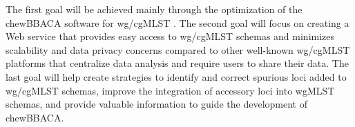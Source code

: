 The first goal will be achieved mainly through the optimization of the chewBBACA software for \ac{wg/cgMLST} \cite{silva_chewbbaca_2018}. The second goal will focus on creating a Web service that provides easy access to \ac{wg/cgMLST} schemas and minimizes scalability and data privacy concerns compared to other well-known \ac{wg/cgMLST} platforms that centralize data analysis and require users to share their data. The last goal will help create strategies to identify and correct spurious loci added to \ac{wg/cgMLST} schemas, improve the integration of accessory loci into \ac{wgMLST} schemas, and provide valuable information to guide the development of chewBBACA.

